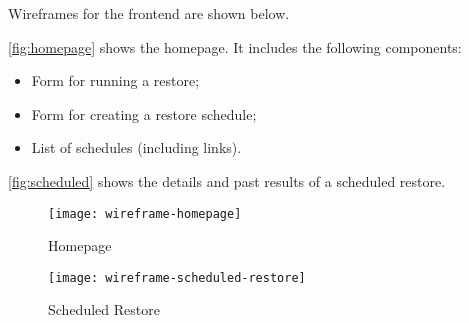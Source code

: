 		Wireframes for the frontend are shown below. 
        
        \autoref{fig:homepage} shows the homepage. It includes the following components:
		\begin{itemize}
			\item Form for running a restore;
			\item Form for creating a restore schedule;
			\item List of schedules (including links).
		\end{itemize}
		\autoref{fig:scheduled} shows the details and past results of a scheduled restore.
		
		
		\begin{figure}[H]
			\setlength{\belowcaptionskip}{15pt plus 3pt minus 2pt}
			\caption{Homepage}
			\centering
			\texttt{[image: wireframe-homepage]}
			\label{fig:homepage}
		\end{figure}
		
		\begin{figure}[H]
			\setlength{\belowcaptionskip}{15pt plus 3pt minus 2pt}
			\caption{Scheduled Restore}
			\centering
			\texttt{[image: wireframe-scheduled-restore]}
			\label{fig:scheduled}
		\end{figure}
	
